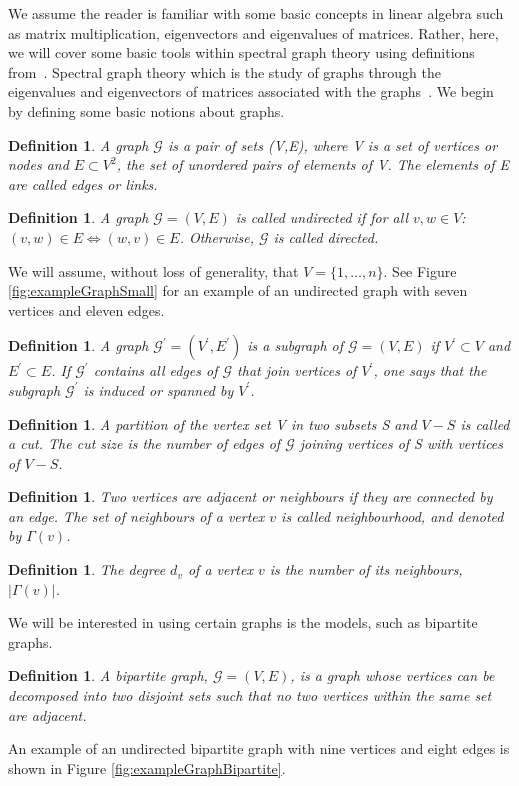 \documentclass[12pt]{article}
\numberwithin{equation}{section}
\newtheorem{definition}[theorem]{Definition}
\begin{document}
We assume the reader is familiar with some basic concepts in linear algebra such as matrix multiplication, eigenvectors and eigenvalues of matrices. Rather, here, we will cover some basic tools within spectral graph theory using definitions from~\cite{For10,New06a, Spi12, Spi07}. Spectral graph theory which is the study of graphs through the eigenvalues and eigenvectors of matrices associated with the graphs~\cite{Spi12}. We begin by defining some basic notions about graphs.
\begin{definition}
\label{def:graph}
	A graph $\mathcal{G}$ is a pair of sets (V,E), where V is a set of vertices or nodes and $E \subset V^{2}$, the set of unordered pairs of elements of V. The elements of E are called edges or links.
\end{definition}
\begin{definition}
\label{def:undirectedGraph}
	A graph $\mathcal{G} = (V,E)$ is called undirected if for all $v,w \in V$: $(v,w) \in E \iff (w,v) \in E$. Otherwise, $\mathcal{G}$ is called directed.
\end{definition}
We will assume, without loss of generality, that $V = \{1,\dots,n\}$. See Figure \ref{fig:exampleGraphSmall} for an example of an undirected graph with seven vertices and eleven edges.
\begin{definition}
\label{def:subGraph}
	A graph $\mathcal{G}^{\prime} = (V^{\prime},E^{\prime})$ is a subgraph of $\mathcal{G} = (V,E)$ if $V^{\prime} \subset V$ and $E^{\prime} \subset E$. If $\mathcal{G}^{\prime}$ contains all edges of $\mathcal{G}$ that join vertices of $V^{\prime}$, one says that the subgraph $\mathcal{G}^{\prime}$ is induced or spanned by $V^{\prime}$.
\end{definition}
\begin{definition}
\label{def:cuts}
	A partition of the vertex set V in two subsets S and $V-S$ is called a cut. The cut size is the number of edges of $\mathcal{G}$ joining vertices of S with vertices of $V-S$.
\end{definition}
\begin{definition}
\label{def:neighbourhoodNode}
	Two vertices are adjacent or neighbours if they are connected by an edge. The set of neighbours of a vertex $v$ is called neighbourhood, and denoted by $\Gamma(v)$.
\end{definition}
\begin{definition}
\label{def:degreeNode}
	The degree $d_{v}$ of a vertex $v$ is the number of its neighbours, $\left\vert{\Gamma(v)}\right\vert$.
\end{definition}
We will be interested in using certain graphs is the models, such as bipartite graphs.
\begin{definition}
\label{def:bipartiteGraph}
	A bipartite graph, $\mathcal{G} = (V,E)$, is a graph whose vertices can be decomposed into two disjoint sets such that no two vertices within the same set are adjacent.
\end{definition}
An example of an undirected bipartite graph with nine vertices and eight edges is shown in Figure \ref{fig:exampleGraphBipartite}.
\end{document}
